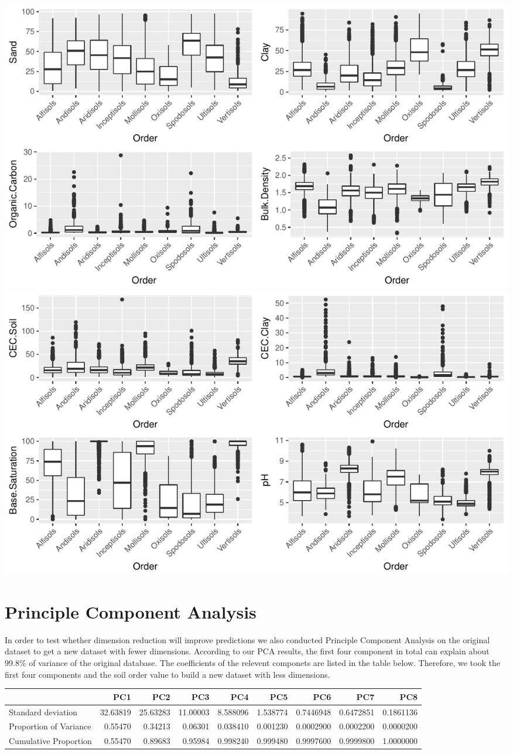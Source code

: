 \documentclass[]{article}
\begin{document}
\includegraphics{Project1_files/figure-latex/EDA - Mer-1.pdf}
\includegraphics{Project1_files/figure-latex/EDA - Mer-2.pdf}

\section{Principle Component
Analysis}\label{principle-component-analysis}

In order to test whether dimension reduction will improve predictions we
also conducted Principle Component Analysis on the original dataset to
get a new dataset with fewer dimensions. According to our PCA results,
the first four component in total can explain about 99.8\% of variance
of the original database. The coefficients of the relevent componets are
listed in the table below. Therefore, we took the first four components
and the soil order value to build a new dataset with less dimensions.

\begin{longtable}[]{@{}lrrrrrrrr@{}}
\toprule
& PC1 & PC2 & PC3 & PC4 & PC5 & PC6 & PC7 & PC8\tabularnewline
\midrule
\endhead
Standard deviation & 32.63819 & 25.63283 & 11.00003 & 8.588096 &
1.538774 & 0.7446948 & 0.6472851 & 0.1861136\tabularnewline
Proportion of Variance & 0.55470 & 0.34213 & 0.06301 & 0.038410 &
0.001230 & 0.0002900 & 0.0002200 & 0.0000200\tabularnewline
Cumulative Proportion & 0.55470 & 0.89683 & 0.95984 & 0.998240 &
0.999480 & 0.9997600 & 0.9999800 & 1.0000000\tabularnewline
\bottomrule
\end{longtable}
\end{document}
